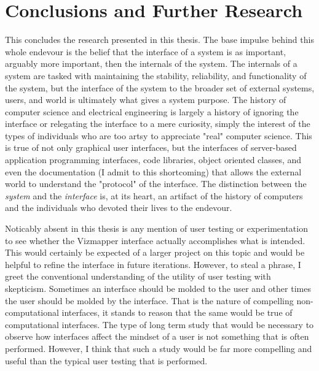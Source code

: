 \resetdatestamp

\chapter{Conclusions and Further Research}

This concludes the research presented in this thesis. The base impulse behind this whole endevour is the belief that the interface of a system is as important, arguably more important, then the internals of the system. The internals of a system are tasked with maintaining the stability, reliability, and functionality of the system, but the interface of the system to the broader set of external systems, users, and world is ultimately what gives a system purpose. The history of computer science and electrical engineering is largely a history of ignoring the interface or relegating the interface to a mere curiosity, simply the interest of the types of individuals who are too artsy to appreciate "real" computer science. This is true of not only graphical user interfaces, but the interfaces of server-based application programming interfaces, code libraries, object oriented classes, and even the documentation (I admit to this shortcoming) that allows the external world to understand the "protocol" of the interface. The distinction between the \emph{system} and the \emph{interface} is, at its heart, an artifact of the history of computers and the individuals who devoted their lives to the endevour.

Noticably absent in this thesis is any mention of user testing or experimentation to see whether the Vizmapper interface actually accomplishes what is intended. This would certainly be expected of a larger project on this topic and would be helpful to refine the interface in future iterations. However, to steal a phrase, I greet the conventional understanding of the utility of user testing with skepticism. Sometimes an interface should be molded to the user and other times the user should be molded by the interface. That is the nature of compelling non-computational interfaces, it stands to reason that the same would be true of computational interfaces. The type of long term study that would be necessary to observe how interfaces affect the mindset of a user is not something that is often performed. However, I think that such a study would be far more compelling and useful than the typical user testing that is performed.
